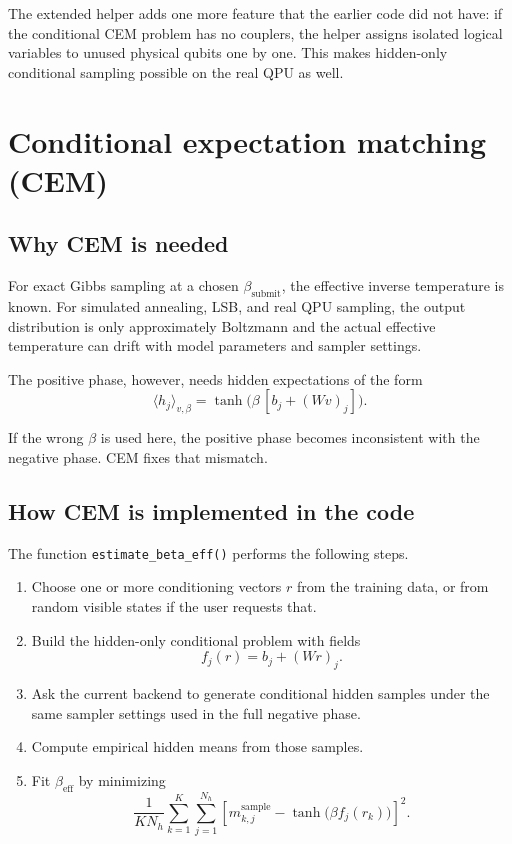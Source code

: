 \documentclass[11pt]{article}
\begin{document}
The extended helper adds one more feature that the earlier code did not have:
if the conditional CEM problem has no couplers, the helper assigns isolated
logical variables to unused physical qubits one by one. This makes hidden-only
conditional sampling possible on the real QPU as well.

\section{Conditional expectation matching (CEM)}

\subsection{Why CEM is needed}

For exact Gibbs sampling at a chosen $\beta_{\mathrm{submit}}$, the effective
inverse temperature is known. For simulated annealing, LSB, and real QPU
sampling, the output distribution is only approximately Boltzmann and the actual
effective temperature can drift with model parameters and sampler settings.

The positive phase, however, needs hidden expectations of the form
\begin{equation}
\langle h_j\rangle_{v,\beta}=\tanh\!\Big(\beta\,[b_j+(Wv)_j]\Big).
\end{equation}

If the wrong $\beta$ is used here, the positive phase becomes inconsistent with
the negative phase. CEM fixes that mismatch.

\subsection{How CEM is implemented in the code}

The function \texttt{estimate\_beta\_eff()} performs the following steps.

\begin{enumerate}
  \item Choose one or more conditioning vectors $r$ from the training data, or
  from random visible states if the user requests that.
  \item Build the hidden-only conditional problem with fields
  \begin{equation}
  f_j(r)=b_j + (Wr)_j.
  \end{equation}
  \item Ask the current backend to generate conditional hidden samples under the
  same sampler settings used in the full negative phase.
  \item Compute empirical hidden means from those samples.
  \item Fit $\beta_{\mathrm{eff}}$ by minimizing
  \begin{equation}
  \frac{1}{KN_h}\sum_{k=1}^K\sum_{j=1}^{N_h}
  \left[m_{k,j}^{\mathrm{sample}}-\tanh\big(\beta f_j(r_k)\big)\right]^2.
  \end{equation}
\end{enumerate}
\end{document}

